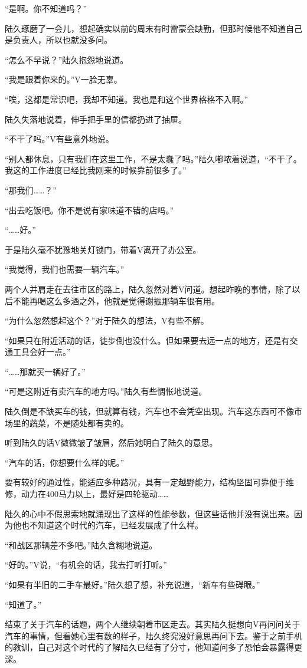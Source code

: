 “是啊。你不知道吗？”

陆久琢磨了一会儿，想起确实以前的周末有时雷蒙会缺勤，但那时候他不知道自己是负责人，所以也就没多问。

“怎么不早说？”陆久抱怨地说道。

“我是跟着你来的。”V一脸无辜。

“唉，这都是常识吧，我却不知道。我也是和这个世界格格不入啊。”

陆久失落地说着，伸手把手里的信都扔进了抽屉。

“不干了吗。”V有些意外地说。

“别人都休息，只有我们在这里工作，不是太蠢了吗。”陆久嘟哝着说道，“不干了。我这的工作进度已经比我刚来的时候靠前很多了。”

“那我们……？”

“出去吃饭吧。你不是说有家味道不错的店吗。”

“……好。”

于是陆久毫不犹豫地关灯锁门，带着V离开了办公室。

“我觉得，我们也需要一辆汽车。”

两个人并肩走在去往市区的路上，陆久忽然对着V问道。想起昨晚的事情，除了以后不能再喝这么多酒之外，他就是觉得谢振那辆车很有用。

“为什么忽然想起这个？”对于陆久的想法，V有些不解。

“如果只在附近活动的话，徒步倒也没什么。但如果要去远一点的地方，还是有交通工具会好一点。”

“……那就买一辆好了。”

“可是这附近有卖汽车的地方吗。”陆久有些惆怅地说道。

陆久倒是不缺买车的钱，但就算有钱，汽车也不会凭空出现。汽车这东西可不像市场里的蔬菜，不是随处都有卖的。

听到陆久的话V微微皱了皱眉，然后她明白了陆久的意思。

“汽车的话，你想要什么样的呢。”

要有较好的通过性，能适应多种路况，具有一定越野能力，结构坚固可靠便于维修，动力在400马力以上，最好是四轮驱动……

陆久的心中不假思索地就涌现出了这样的性能参数，但这些话他并没有说出来。因为他也不知道这个时代的汽车，已经发展成了什么样。

“和战区那辆差不多吧。”陆久含糊地说道。

“好的。”V说，“有机会的话，我去打听打听。”

“如果有半旧的二手车最好。”陆久想了想，补充说道，“新车有些碍眼。”

“知道了。”

结束了关于汽车的话题，两个人继续朝着市区走去。其实陆久挺想向V再问问关于汽车的事情，但看她心里有数的样子，陆久终究没好意思再问下去。鉴于之前手机的教训，自己对这个时代的了解陆久已经有了分寸，他知道问多了恐怕会暴露得更深。

